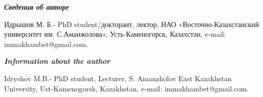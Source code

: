 \begin{authorinfo}
\hspace{1em}\emph{{\bfseries Сведения об авторе}}

Идрышов М. Б.- PhD student/докторант, лектор, НАО
«Восточно-Казахстанский университет им. С.Аманжолова», Усть-Каменогорск,
Казахстан, e-mail: immakhambet@gmail.com.

\hspace{1em}\emph{{\bfseries Information about the author}}

Idryshov M.B.- PhD student, Lecturer, S. Amanzholov East Kazakhstan
University, Ust-Kamenogorsk, Kazakhstan, e-mail: immakhambet@gmail.com.
\end{authorinfo}

